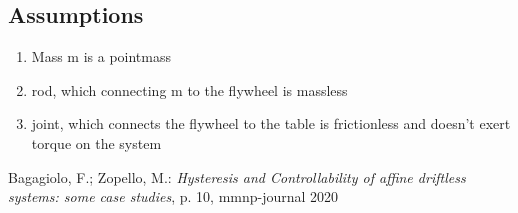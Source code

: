 \documentclass[10pt,a4paper]{article}
\begin{document}
	
	\subsection{Assumptions} %
		\begin{enumerate} %
			\item Mass m is a pointmass
			\item rod, which connecting m to the flywheel is massless
			\item joint, which connects the flywheel to the table is frictionless and doesn't exert torque on the system
		\end{enumerate}
	
	
	
	\begin{thebibliography}{10}		
		Bagagiolo, F.; Zopello, M.: 
		\textit{Hysteresis and Controllability of affine driftless systems: some case studies}, p. 10, mmnp-journal 2020
	\end{thebibliography}
\end{document}
